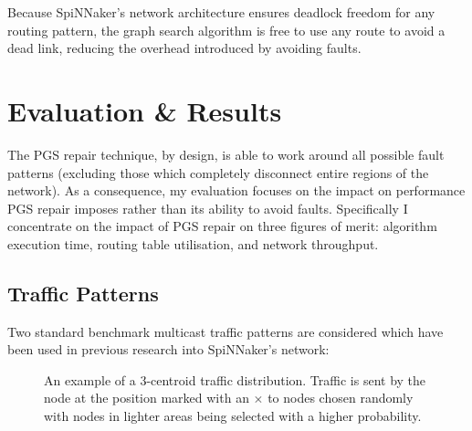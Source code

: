 		Because SpiNNaker's network architecture ensures deadlock freedom for any
		routing pattern, the graph search algorithm is free to use any route to
		avoid a dead link, reducing the overhead introduced by avoiding faults.
		
	\section{Evaluation \& Results}
		
		\label{sec:routing-evaluation}
		
		The PGS repair technique, by design, is able to work around all possible
		fault patterns (excluding those which completely disconnect entire regions
		of the network). As a consequence, my evaluation focuses on the impact on
		performance PGS repair imposes rather than its ability to avoid faults.
		Specifically I concentrate on the impact of PGS repair on three figures of
		merit: algorithm execution time, routing table utilisation, and network
		throughput.
		
		\subsection{Traffic Patterns}
			
			Two standard benchmark multicast traffic patterns are considered which
			have been used in previous research into SpiNNaker's network:
			
			\begin{figure}
				\center
				
				\caption[An example of a 3-centroid traffic distribution.]%
				{An example of a 3-centroid traffic distribution. Traffic is
				sent by the node at the position marked with an {\color{red}$\times$}
				to nodes chosen randomly with nodes in lighter areas being selected
				with a higher probability.}
				\label{fig:traffic-distribution-centroids}
			\end{figure}
			
